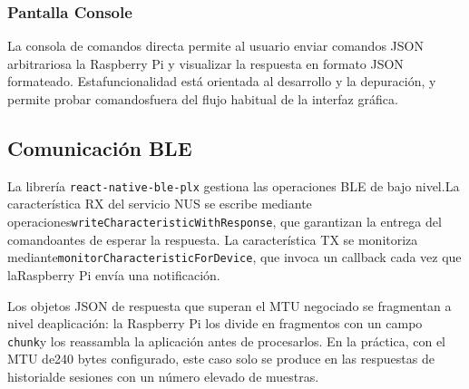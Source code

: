 \subsubsection{Pantalla Console}

La consola de comandos directa permite al usuario enviar comandos JSON arbitrariosa la Raspberry Pi y visualizar la respuesta en formato JSON formateado. Estafuncionalidad está orientada al desarrollo y la depuración, y permite probar comandosfuera del flujo habitual de la interfaz gráfica.


\subsection{Comunicación BLE}

La librería \texttt{react-native-ble-plx} gestiona las operaciones BLE de bajo nivel.La característica RX del servicio NUS se escribe mediante operaciones\texttt{writeCharacteristicWithResponse}, que garantizan la entrega del comandoantes de esperar la respuesta. La característica TX se monitoriza mediante\texttt{monitorCharacteristicForDevice}, que invoca un callback cada vez que laRaspberry Pi envía una notificación.

Los objetos JSON de respuesta que superan el MTU negociado se fragmentan a nivel deaplicación: la Raspberry Pi los divide en fragmentos con un campo \texttt{chunk}y los reassambla la aplicación antes de procesarlos. En la práctica, con el MTU de240 bytes configurado, este caso solo se produce en las respuestas de historialde sesiones con un número elevado de muestras.
